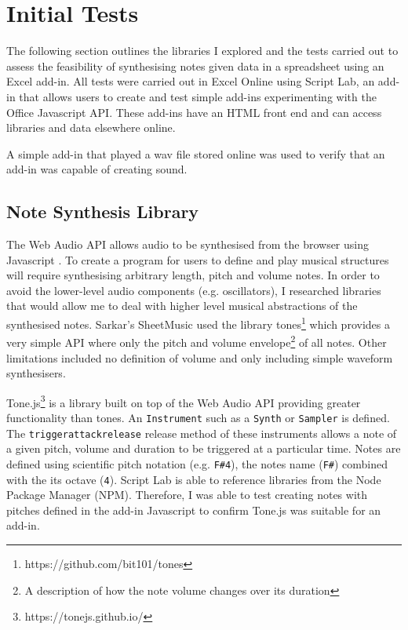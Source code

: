 \documentclass{article}
\begin{document}
\section{Initial Tests}

The following section outlines the libraries I explored and the tests carried out to assess the feasibility of synthesising notes given data in a spreadsheet using an Excel add-in. All tests were carried out in Excel Online using Script Lab, an add-in that allows users to create and test simple add-ins experimenting with the Office Javascript API. These add-ins have an HTML front end and can access libraries and data elsewhere online.

A simple add-in that played a wav file stored online was used to verify that an add-in was capable of creating sound.

\subsection{Note Synthesis Library}

The Web Audio API allows audio to be synthesised from the browser using Javascript \cite{mozilla:webaudioapi}. To create a program for users to define and play musical structures will require synthesising arbitrary length, pitch and volume notes. In order to avoid the lower-level audio components (e.g. oscillators), I researched libraries that would allow me to deal with higher level musical abstractions of the synthesised notes. Sarkar's SheetMusic used the library tones\footnote{https://github.com/bit101/tones} which provides a very simple API where only the pitch and volume envelope\footnote{A description of how the note volume changes over its duration} of all notes. Other limitations included no definition of volume and only including simple waveform synthesisers.

Tone.js\footnote{https://tonejs.github.io/} is a library built on top of the Web Audio API providing greater functionality than tones. An \texttt{Instrument} such as a \texttt{Synth} or \texttt{Sampler} is defined. The \texttt{triggerattackrelease} release method of these instruments allows a note of a given pitch, volume and duration to be triggered at a particular time. Notes are defined using scientific pitch notation (e.g. \texttt{F\#4}), the notes name (\texttt{F\#}) combined with the its octave (\texttt{4}). Script Lab is able to reference libraries from the Node Package Manager (NPM). Therefore, I was able to test creating notes with pitches defined in the add-in Javascript to confirm Tone.js was suitable for an add-in.
\end{document}
